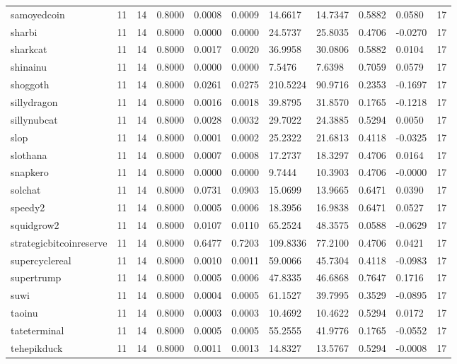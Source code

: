 \begin{table}[htbp]
\begin{tabular}{lllllllllll}
samoyedcoin & 11 & 14 & 0.8000 & 0.0008 & 0.0009 & 14.6617 & 14.7347 & 0.5882 & 0.0580 & 17 \\
sharbi & 11 & 14 & 0.8000 & 0.0000 & 0.0000 & 24.5737 & 25.8035 & 0.4706 & -0.0270 & 17 \\
sharkcat & 11 & 14 & 0.8000 & 0.0017 & 0.0020 & 36.9958 & 30.0806 & 0.5882 & 0.0104 & 17 \\
shinainu & 11 & 14 & 0.8000 & 0.0000 & 0.0000 & 7.5476 & 7.6398 & 0.7059 & 0.0579 & 17 \\
shoggoth & 11 & 14 & 0.8000 & 0.0261 & 0.0275 & 210.5224 & 90.9716 & 0.2353 & -0.1697 & 17 \\
sillydragon & 11 & 14 & 0.8000 & 0.0016 & 0.0018 & 39.8795 & 31.8570 & 0.1765 & -0.1218 & 17 \\
sillynubcat & 11 & 14 & 0.8000 & 0.0028 & 0.0032 & 29.7022 & 24.3885 & 0.5294 & 0.0050 & 17 \\
slop & 11 & 14 & 0.8000 & 0.0001 & 0.0002 & 25.2322 & 21.6813 & 0.4118 & -0.0325 & 17 \\
slothana & 11 & 14 & 0.8000 & 0.0007 & 0.0008 & 17.2737 & 18.3297 & 0.4706 & 0.0164 & 17 \\
snapkero & 11 & 14 & 0.8000 & 0.0000 & 0.0000 & 9.7444 & 10.3903 & 0.4706 & -0.0000 & 17 \\
solchat & 11 & 14 & 0.8000 & 0.0731 & 0.0903 & 15.0699 & 13.9665 & 0.6471 & 0.0390 & 17 \\
speedy2 & 11 & 14 & 0.8000 & 0.0005 & 0.0006 & 18.3956 & 16.9838 & 0.6471 & 0.0527 & 17 \\
squidgrow2 & 11 & 14 & 0.8000 & 0.0107 & 0.0110 & 65.2524 & 48.3575 & 0.0588 & -0.0629 & 17 \\
strategicbitcoinreserve & 11 & 14 & 0.8000 & 0.6477 & 0.7203 & 109.8336 & 77.2100 & 0.4706 & 0.0421 & 17 \\
supercyclereal & 11 & 14 & 0.8000 & 0.0010 & 0.0011 & 59.0066 & 45.7304 & 0.4118 & -0.0983 & 17 \\
supertrump & 11 & 14 & 0.8000 & 0.0005 & 0.0006 & 47.8335 & 46.6868 & 0.7647 & 0.1716 & 17 \\
suwi & 11 & 14 & 0.8000 & 0.0004 & 0.0005 & 61.1527 & 39.7995 & 0.3529 & -0.0895 & 17 \\
taoinu & 11 & 14 & 0.8000 & 0.0003 & 0.0003 & 10.4692 & 10.4622 & 0.5294 & 0.0172 & 17 \\
tateterminal & 11 & 14 & 0.8000 & 0.0005 & 0.0005 & 55.2555 & 41.9776 & 0.1765 & -0.0552 & 17 \\
tehepikduck & 11 & 14 & 0.8000 & 0.0011 & 0.0013 & 14.8327 & 13.5767 & 0.5294 & -0.0008 & 17 \\

\end{tabular}
\end{table}
